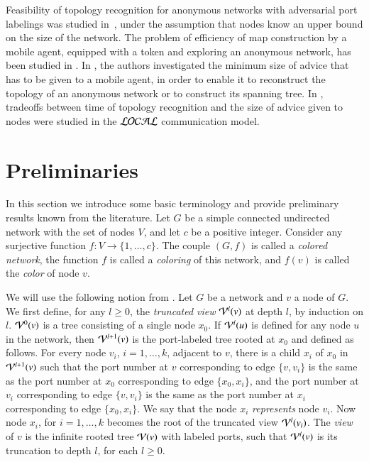 \documentclass[a4paper,10pt]{article}
\newcommand{\cV}{{\cal V}}
\begin{document}
Feasibility of topology recognition for anonymous networks with adversarial port labelings was studied in~\cite{YK3},
under the assumption that nodes know an upper bound on the size of the network.
The problem of efficiency of map construction by a mobile agent, equipped with a token and exploring an anonymous network,  has
been studied in \cite{CDK}. In \cite{DP}, the authors investigated the minimum size of advice
that has to be given to a mobile agent, in order to enable it to reconstruct  the topology of an anonymous network or to construct its spanning tree.
In \cite{FPR},
tradeoffs between time of topology recognition and the size of advice given to nodes were studied
in the $\cal{LOCAL}$ communication model.  



\section{Preliminaries} \label{sec:feasibility}


In this section we introduce some basic terminology and provide preliminary  results known from the literature. Let $G$ be a simple connected undirected network with the set of nodes $V$, and let $c$ be a positive integer.
Consider any surjective function $f: V \longrightarrow \{1,\dots , c\}$.
The couple $(G,f)$ is called a {\em colored network}, the function $f$ is called a
{\em coloring} of this network, and $f(v)$ is called the {\em color} of node $v$. 



We will use the following notion from \cite{YK3}. Let $G$ be a network and $v$ a node of $G$.  We first define, for any $l \geq 0$,  the {\em truncated view}
$\cV^l(v)$ at depth $l$, by induction on $l$. $\cV^0(v)$ is a tree consisting of a single node $x_0$. 
If $\cV^l(u)$ is defined for any node $u$ in the network, then $\cV^{l+1}(v)$ is the port-labeled tree
rooted at $x_0$ and defined as follows.
For every node $v_i$, $i=1,\dots ,k$, adjacent to $v$, 
there is a child $x_i$ of $x_0$ in $\cV^{l+1}(v)$ such that the port number at $v$ corresponding to edge $\{v,v_i\} $ is the same as the port number 
at $x_0$ corresponding to edge $\{x_0,x_i\}$,
and the port number at $v_i$ corresponding to edge $\{v,v_i\} $ is the same as the port number at $x_i$ corresponding to edge $\{x_0,x_i\}$.  We say that the node $x_i$ {\em represents} node $v_i$.
Now node $x_i$, for $i=1,\dots ,k$ becomes 
the root of the truncated view $\cV^l(v_i)$.   
 The {\em view} of $v$ is the infinite rooted tree $\cV(v)$ with labeled ports, such that $\cV^l(v)$ is its truncation to depth $l$, for each $l\geq 0$.
\end{document}
